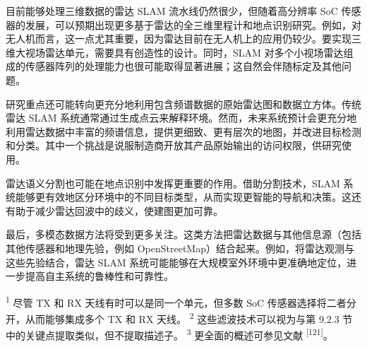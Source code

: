 目前能够处理三维数据的雷达 SLAM 流水线仍然很少，但随着高分辨率 SoC 传感器的发展，可以预期出现更多基于雷达的全三维里程计和地点识别研究。例如，对无人机而言，这一点尤其重要，因为雷达目前在无人机上的应用仍较少。要实现三维大视场雷达单元，需要具有创造性的设计。同时，SLAM 对多个小视场雷达组成的传感器阵列的处理能力也很可能取得显著进展；这自然会伴随标定及其他问题。

研究重点还可能转向更充分地利用包含频谱数据的原始雷达图和数据立方体。传统雷达 SLAM 系统通常通过生成点云来解释环境。然而，未来系统预计会更充分地利用雷达数据中丰富的频谱信息，提供更细致、更有层次的地图，并改进目标检测和分类。其中一个挑战是说服制造商开放其产品原始输出的访问权限，供研究使用。

雷达语义分割也可能在地点识别中发挥更重要的作用。借助分割技术，SLAM 系统能够更有效地区分环境中的不同目标类型，从而实现更智能的导航和决策。这还有助于减少雷达回波中的歧义，使建图更加可靠。

最后，多模态数据方法将受到更多关注。这类方法把雷达数据与其他信息源（包括其他传感器和地理先验，例如 OpenStreetMap）结合起来。例如，将雷达观测与这些先验结合，雷达 SLAM 系统可能能够在大规模室外环境中更准确地定位，进一步提高自主系统的鲁棒性和可靠性。

\textsuperscript{1} 尽管 TX 和 RX 天线有时可以是同一个单元，但多数 SoC 传感器选择将二者分开，从而能够集成多个 TX 和 RX 天线。
\textsuperscript{2} 这些滤波技术可以视为与第 9.2.3 节中的关键点提取类似，但不提取描述子。
\textsuperscript{3} 更全面的概述可参见文献 \textsuperscript{[121]}。
